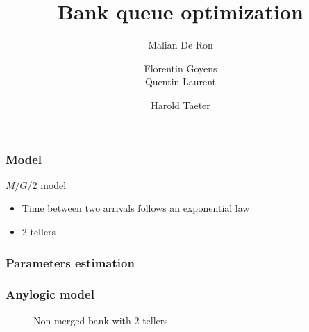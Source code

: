 \documentclass[10pt]{beamer}
\title{Bank queue optimization}
\author[Malian DR, Florentin G, Quentin L, Harlod T]{
  \small
  Malian De Ron
  \and
  Florentin Goyens
  \\
  Quentin Laurent
  \and
  Harold Taeter
}
\begin{document}
\begin{frame}
  \maketitle
\end{frame}

\begin{frame}
  \frametitle{Model}
  \begin{block}{$M/G/2$ model}
  \begin{itemize}
    \item Time between two arrivals follows an exponential law
    \item 2 tellers
    \end{itemize}
  \end{block}
\end{frame}


\begin{frame}
  \frametitle{Parameters estimation}
 
  
\end{frame}

\begin{frame}
  \frametitle{Anylogic model}
  \begin{figure}
  \centering
{}

\caption{Non-merged bank with 2 tellers}
  \end{figure}
\end{frame}
\end{document}
